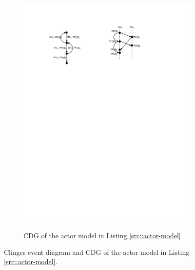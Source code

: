 \begin{figure}
\begin{subfigure}[b]{0.2\textwidth}
  \centering
  \small{
   \includegraphics[width=.8\textwidth]{resources/cdg.pdf}
  }
  \caption{CDG of the actor model in Listing \ref{src::actor-model}}
  \label{fig::cdg}
\end{subfigure}
\caption{Clinger event diagram and CDG of the actor model in Listing \ref{src::actor-model}.}
\label{fig::clinger-cdg}
\end{figure}

